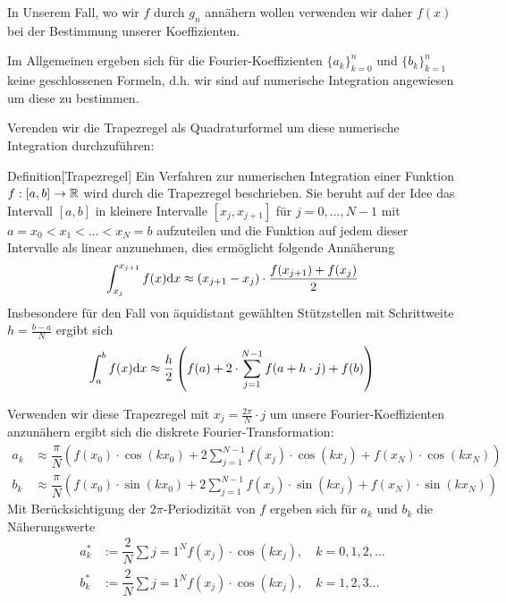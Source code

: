 In Unserem Fall, wo wir $f$ durch $g_n$ annähern wollen verwenden wir daher $f(x)$ bei der Bestimmung unserer 
Koeffizienten.

Im Allgemeinen ergeben sich für die Fourier-Koeffizienten $\{a_k\}_{k=0}^n$ und $\{b_k\}_{k=1}^n$ keine geschlossenen 
Formeln, d.h. wir sind auf numerische Integration angewiesen um diese zu bestimmen.

Verenden wir die Trapezregel als Quadraturformel um diese numerische Integration durchzuführen:

\begin{colbox}{Definition}[Trapezregel]
  Ein Verfahren zur numerischen Integration einer Funktion $f:[a,b]\to\mathbb R$ wird durch die Trapezregel beschrieben. Sie 
  beruht auf der Idee das Intervall $[a,b]$ in kleinere Intervalle $[x_j, x_{j+1}]$ für $j=0,\dots,N-1$ mit 
  $a=x_0<x_1<\dots<x_N=b$ aufzuteilen und die Funktion auf jedem dieser Intervalle als linear anzunehmen, 
  dies ermöglicht folgende Annäherung 
  \begin{align*}
    \int_{x_j}^{x_{j+1}} f(x) \text{d} x \approx (x_{j+1}-x_j)\cdot\dfrac{f(x_{j+1})+f(x_j)}{2}
  \end{align*}
  Insbesondere für den Fall von äquidistant gewählten Stützstellen mit Schrittweite $h=\tfrac{b-a}{N}$ ergibt sich
  \begin{align*}
    \int_{a}^{b} f(x) \text{d} x \approx \dfrac{h}{2}\left(f(a) + 2\cdot\sum_{j=1}^{N-1}f(a + h\cdot j) + f(b) \right)
  \end{align*}
\end{colbox}

Verwenden wir diese Trapezregel mit $x_j=\tfrac{2\pi}{N}\cdot j$ um unsere Fourier-Koeffizienten anzunähern 
ergibt sich die diskrete Fourier-Transformation:
%
\begin{align*}
  a_k &\approx\dfrac{\pi}{N}\left(f(x_0)\cdot\cos(kx_0) 
  + 2\sum_{j=1}^{N-1} f(x_j)\cdot\cos(kx_j) + f(x_N)\cdot \cos(kx_N)\right) \\
  b_k &\approx\dfrac{\pi}{N}\left(f(x_0)\cdot\sin(kx_0)  
  + 2\sum_{j=1}^{N-1} f(x_j)\cdot\sin(kx_j) + f(x_N)\cdot \sin(kx_N)\right)
\end{align*}
%
Mit Berücksichtigung der $2\pi$-Periodizität von $f$ ergeben sich für $a_k$ und $b_k$ die Näherungswerte
%
\begin{align*}
  a_k^* &:= \dfrac{2}{N}\sum{j=1}^N f(x_j)\cdot \cos(kx_j), \quad k=0,1,2,\dots \\
  b_k^* &:= \dfrac{2}{N}\sum{j=1}^N f(x_j)\cdot \cos(kx_j), \quad k=1,2,3\dots
\end{align*}

